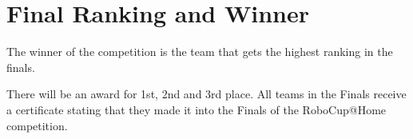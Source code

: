 \OpenDemonstrationChanges

\section{Final Ranking and Winner}

The winner of the competition is the team that gets the highest
ranking in the finals.

There will be an award for 1st, 2nd and 3rd place. All teams in the
Finals receive a certificate stating that they made it into the Finals
of the RoboCup@Home competition.


